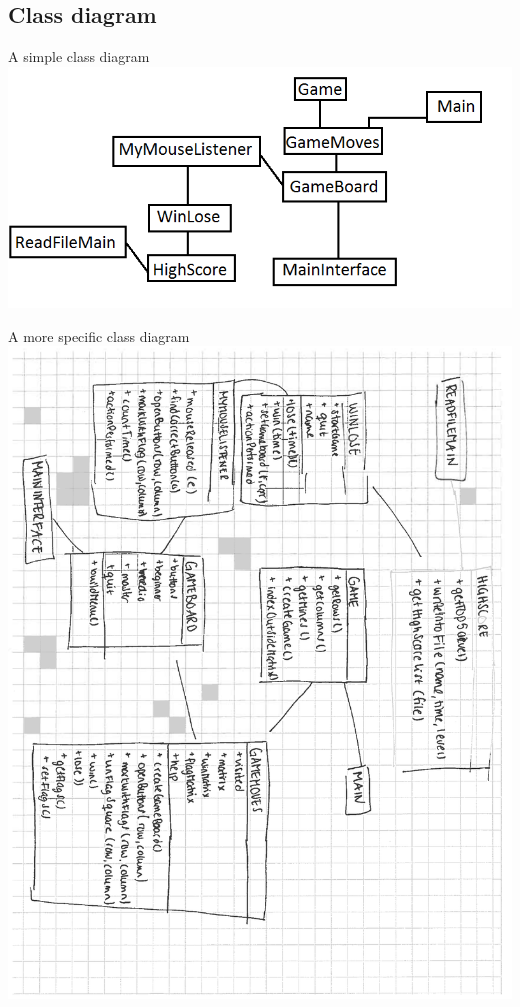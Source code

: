 \documentclass[12pt,twoside,a4paper]{article}
\begin{document}
\subsection{Class diagram}
A simple class diagram \\
\includegraphics{classdiagram.png}
\newpage

A more specific class diagram \\
\includegraphics[scale = 0.5, angle = 90]{class.pdf}
\end{document}
